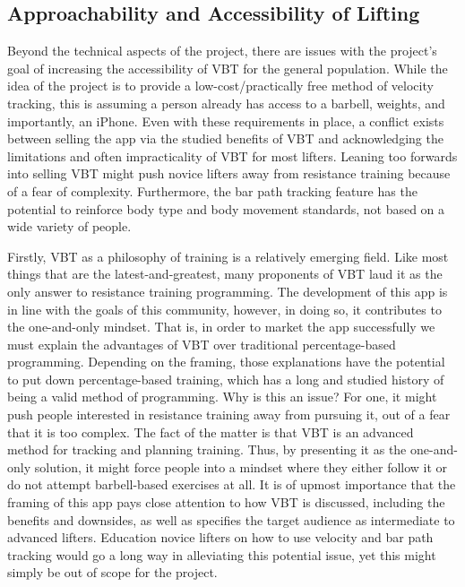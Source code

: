 \documentclass[10pt,twocolumn]{article}
\begin{document}
\subsection{Approachability and Accessibility of Lifting}
Beyond the technical aspects of the project, there are issues with the project's goal of increasing the accessibility of VBT for the general population. While the idea of the project is to provide a low-cost/practically free method of velocity tracking, this is assuming a person already has access to a barbell, weights, and importantly, an iPhone. Even with these requirements in place, a conflict exists between selling the app via the studied benefits of VBT and acknowledging the limitations and often impracticality of VBT for most lifters. Leaning too forwards into selling VBT might push novice lifters away from resistance training because of a fear of complexity. Furthermore, the bar path tracking feature has the potential to reinforce body type and body movement standards, not based on a wide variety of people. \par

Firstly, VBT as a philosophy of training is a relatively emerging field. Like most things that are the latest-and-greatest, many proponents of VBT laud it as the only answer to resistance training programming. The development of this app is in line with the goals of this community, however, in doing so, it contributes to the one-and-only mindset. That is, in order to market the app successfully we must explain the advantages of VBT over traditional percentage-based programming. Depending on the framing, those explanations have the potential to put down percentage-based training, which has a long and studied history of being a valid method of programming. Why is this an issue? For one, it might push people interested in resistance training away from pursuing it, out of a fear that it is too complex. The fact of the matter is that VBT is an advanced method for tracking and planning training. Thus, by presenting it as the one-and-only solution, it might force people into a mindset where they either follow it or do not attempt barbell-based exercises at all. It is of upmost importance that the framing of this app pays close attention to how VBT is discussed, including the benefits and downsides, as well as specifies the target audience as intermediate to advanced lifters. Education novice lifters on how to use velocity and bar path tracking would go a long way in alleviating this potential issue, yet this might simply be out of scope for the project. \par
\end{document}
